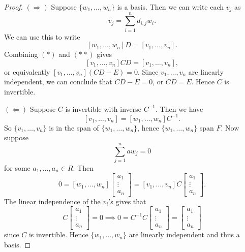 \begin{proof}
  $(\Rightarrow)$ Suppose $\{w_1, \dots, w_n\}$ is a
  basis. Then we can write each $v_j$ as
  \[
    v_j = \sum_{i = 1}^n d_{i, j} w_i.
  \]
  We can use this to write
  \[
    [w_1, \dots, w_n] D = [v_1, \dots, v_n]. \tag{$*$}
  \]
  Combining $(*)$ and $(**)$ gives
  \[
    [v_1, \dots, v_n] CD = [v_1, \dots, v_n],
  \]
  or equivalently $[v_1, \dots, v_n] (CD - E) = 0$.
  Since $v_1, \dots, v_n$ are linearly independent,
  we can conclude that
  $CD - E = 0$, or $CD = E$. Hence $C$ is invertible.

  $(\Leftarrow)$ Suppose $C$ is invertible with
  inverse $C^{-1}$. Then we have
  \[
    [v_1, \dots, v_n] = [w_1, \dots, w_n] C^{-1}.
  \]
  So $\{v_1, \dots, v_n\}$ is in the span of
  $\{w_1, \dots, w_n\}$, hence $\{w_1, \dots, w_n\}$
  span $F$. Now suppose
  \[
    \sum_{j = 1}^n a w_j = 0
  \]
  for some $a_1, \dots, a_n \in R$. Then
  \[
    0 = [w_1, \dots, w_n] \begin{bmatrix} a_1 \\ \vdots \\ a_n \end{bmatrix}
    = [v_1, \dots, v_n] C \begin{bmatrix} a_1 \\ \vdots \\ a_n \end{bmatrix}.
  \]
  The linear independence of the $v_i$'s gives that
  \[
    C \begin{bmatrix} a_1 \\ \vdots \\ a_n \end{bmatrix} = 0 \implies 0 = C^{-1} C \begin{bmatrix} a_1 \\ \vdots \\ a_n \end{bmatrix} = \begin{bmatrix} a_1 \\ \vdots \\ a_n \end{bmatrix}
  \]
  since $C$ is invertible. Hence $\{w_1, \dots, w_n\}$
  are linearly independent and thus a basis.
\end{proof}

